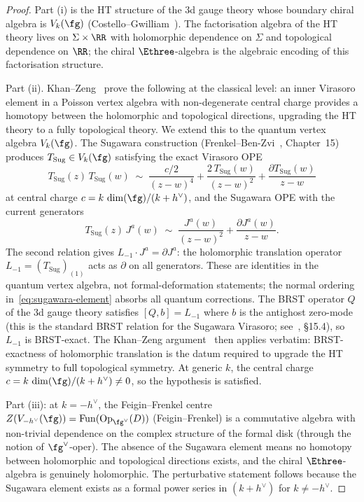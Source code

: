 \begin{proof}
Part (i) is the HT structure of the $3$d gauge theory
whose boundary chiral algebra is $V_k(\fg)$
(Costello--Gwilliam~\cite{CG17}). The factorisation
algebra of the HT theory lives on $\Sigma \times \RR$
with holomorphic dependence on $\Sigma$ and topological
dependence on $\RR$; the chiral $\Ethree$-algebra is the
algebraic encoding of this factorisation structure.

Part (ii).
Khan--Zeng~\cite{KhanZeng25} prove the following at the
classical level: an inner Virasoro element in a Poisson
vertex algebra with non-degenerate central charge provides
a homotopy between the holomorphic and topological
directions, upgrading the HT theory to a fully topological
theory. We extend this to the quantum vertex algebra
$V_k(\fg)$. The Sugawara construction
(Frenkel--Ben-Zvi~\cite{FBZ04}, Chapter~15) produces
$T_{\mathrm{Sug}} \in V_k(\fg)$ satisfying the exact
Virasoro OPE
\[
  T_{\mathrm{Sug}}(z)\,T_{\mathrm{Sug}}(w) \;\sim\;
  \frac{c/2}{(z-w)^4}
  + \frac{2\,T_{\mathrm{Sug}}(w)}{(z-w)^2}
  + \frac{\partial T_{\mathrm{Sug}}(w)}{z-w}
\]
at central charge $c = k\,\dim(\fg)/(k+h^\vee)$, and the
Sugawara OPE with the current generators
\[
  T_{\mathrm{Sug}}(z)\,J^a(w) \;\sim\;
  \frac{J^a(w)}{(z-w)^2}
  + \frac{\partial J^a(w)}{z-w}.
\]
The second relation gives $L_{-1} \cdot J^a = \partial J^a$:
the holomorphic translation operator $L_{-1} = (T_{\mathrm{Sug}})_{(1)}$
acts as $\partial$ on all generators. These are identities in
the quantum vertex algebra, not formal-deformation statements;
the normal ordering in~\eqref{eq:sugawara-element} absorbs
all quantum corrections.  The BRST operator $Q$ of the $3$d
gauge theory satisfies $[Q, b] = L_{-1}$ where $b$ is the
antighost zero-mode (this is the standard BRST relation for
the Sugawara Virasoro; see~\cite{FBZ04}, \S15.4), so
$L_{-1}$ is BRST-exact. The Khan--Zeng
argument~\cite{KhanZeng25} then applies verbatim: BRST-exactness
of holomorphic translation is the datum required to upgrade
the HT symmetry to full topological symmetry. At generic
$k$, the central charge
$c = k\,\dim(\fg)/(k+h^\vee) \neq 0$, so the hypothesis is
satisfied.

Part (iii): at $k = -h^\vee$, the Feigin--Frenkel centre
$Z(V_{-h^\vee}(\fg)) = \mathrm{Fun}(\mathrm{Op}_{\fg^\vee}(D))$
(Feigin--Frenkel) is a commutative
algebra with non-trivial dependence on the complex structure
of the formal disk (through the notion of $\fg^\vee$-oper).
The absence of the Sugawara element means no homotopy
between holomorphic and topological directions exists, and
the chiral $\Ethree$-algebra is genuinely holomorphic.
The perturbative statement follows because the Sugawara
element exists as a formal power series in $(k + h^\vee)$ for
$k \neq -h^\vee$.
\end{proof}


